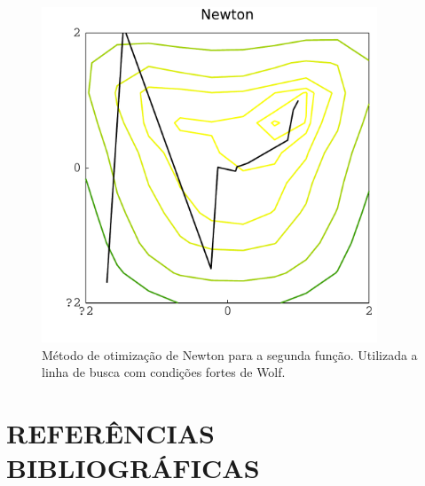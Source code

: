 \documentclass[12pt]{article}
\begin{document}
\begin{figure}[ht!]
	\centering
	\includegraphics[width=10cm]{Figuras/Newton_strongf1}
		\caption{Método de otimização de Newton para a segunda função. Utilizada a linha de busca com condições fortes de Wolf.} 
	\label{fig:new3f}
\end{figure} 
 \section{REFERÊNCIAS BIBLIOGRÁFICAS}
 
 
 
 

 
\end{document}
